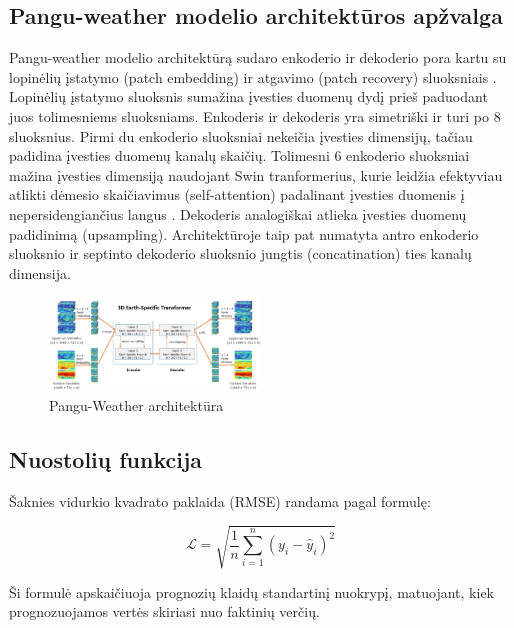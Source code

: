 \documentclass[conference]{IEEEtran}
\begin{document}
\subsection{Pangu-weather modelio architektūros apžvalga}

Pangu-weather modelio architektūrą sudaro enkoderio ir dekoderio pora kartu su lopinėlių įstatymo (patch embedding) ir atgavimo (patch recovery) sluoksniais \cite{bi2022pangu}. Lopinėlių įstatymo sluoksnis sumažina įvesties duomenų dydį prieš paduodant juos tolimesniems sluoksniams. Enkoderis ir dekoderis yra simetriški ir turi po 8 sluoksnius. Pirmi du enkoderio sluoksniai nekeičia įvesties dimensijų, tačiau padidina įvesties duomenų kanalų skaičių. Tolimesni 6 enkoderio sluoksniai mažina įvesties dimensiją naudojant Swin tranformerius, kurie leidžia efektyviau atlikti dėmesio skaičiavimus (self-attention) padalinant įvesties duomenis į nepersidengiančius langus \cite{liu2021swin}. Dekoderis analogiškai atlieka įvesties duomenų padidinimą (upsampling). Architektūroje taip pat numatyta antro enkoderio sluoksnio ir septinto dekoderio sluoksnio jungtis (concatination) ties kanalų dimensija. 

\begin{figure}[htb!] %
\centerline{\includegraphics[width=0.5\textwidth]{img/pangu-weather-architecture.png}}
\caption{Pangu-Weather architektūra}
\label{fig1}
\end{figure}

\newpage
\subsection{Nuostolių funkcija}

Šaknies vidurkio kvadrato paklaida (RMSE) randama pagal formulę:

\begin{equation}
\mathcal{L} = \sqrt{\frac{1}{n} \sum_{i=1}^n (y_i - \hat{y}_i)^2}
\label{eq:lygtis1}
\end{equation}

Ši formulė apskaičiuoja prognozių klaidų  standartinį nuokrypį, matuojant, kiek prognozuojamos vertės skiriasi nuo faktinių verčių.
\end{document}
